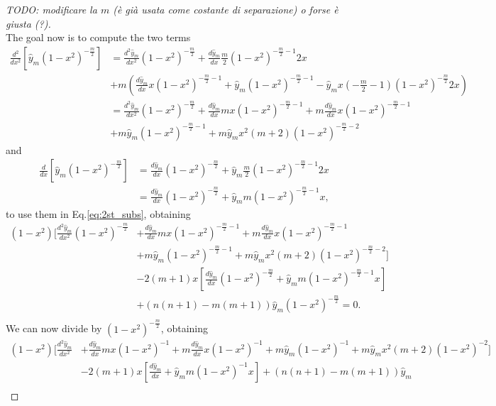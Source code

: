 \begin{proof} [TODO: modificare la $m$ (è già usata come costante di separazione) o forse è giusta (?)]
\begin{equation}
    \end{equation}
    The goal now is to compute the two terms 
    \begin{align*}
    \frac{d^2}{dx^2}[\hat{y}_m(1-x^2)^{-\frac{m}{2}}] &=  \frac{d^2\hat{y}_m}{dx^2} (1-x^2)^{-\frac{m}{2}} + \frac{d\hat{y}_m}{dx}\frac{m}{2}(1-x^2)^{-\frac{m}{2}-1}2x \\
    &+ m\left( \frac{d\hat{y}_m}{dx} x (1-x^2)^{-\frac{m}{2}-1} + \hat{y}_m (1-x^2)^{-\frac{m}{2}-1} - \hat{y}_m x (-\frac{m}{2}-1)(1-x^2)^{-\frac{m}{2}} 2x\right) \\
    &= \frac{d^2\hat{y}_m}{dx^2} (1-x^2)^{-\frac{m}{2}} + \frac{d\hat{y}_m}{dx}mx (1-x^2)^{-\frac{m}{2}-1} + m\frac{d\hat{y}_m}{dx}x (1-x^2)^{-\frac{m}{2}-1}\\
    &+ m\hat{y}_m  (1-x^2)^{-\frac{m}{2}-1} + m\hat{y}_m x^2(m+2)(1-x^2)^{-\frac{m}{2}-2}
    \end{align*}
    and
    \begin{align*}
    \frac{d}{dx}[\hat{y}_m(1-x^2)^{-\frac{m}{2}}] &= \frac{d\hat{y}_m}{dx}(1-x^2)^{-\frac{m}{2}} + \hat{y}_m\frac{m}{2}(1-x^2)^{-\frac{m}{2}-1}2x \\
    &= \frac{d\hat{y}_m}{dx}(1-x^2)^{-\frac{m}{2}} + \hat{y}_mm(1-x^2)^{-\frac{m}{2}-1}x,
    \end{align*}
    to use them in Eq.\eqref{eq:2st_subs}, obtaining
    \begin{align*}
    (1-x^2)\biggl[\frac{d^2\hat{y}_m}{dx^2} (1-x^2)^{-\frac{m}{2}} &+ \frac{d\hat{y}_m}{dx}mx (1-x^2)^{-\frac{m}{2}-1} + m\frac{d\hat{y}_m}{dx}x (1-x^2)^{-\frac{m}{2}-1} \\ 
    &+ m\hat{y}_m  (1-x^2)^{-\frac{m}{2}-1} + m\hat{y}_m x^2(m+2)(1-x^2)^{-\frac{m}{2}-2}\biggr] \\
    &-2(m+1)x\left[  \frac{d\hat{y}_m}{dx}(1-x^2)^{-\frac{m}{2}} + \hat{y}_mm(1-x^2)^{-\frac{m}{2}-1}x \right] \\
    &+ (n(n+1)-m(m+1))\hat{y}_m(1-x^2)^{-\frac{m}{2}}=0.\\
    \end{align*}
    We can now divide by $(1-x^2)^{-\frac{m}{2}}$, obtaining
    \begin{align*}
    (1-x^2)\biggl[\frac{d^2\hat{y}_m}{dx^2} &+ \frac{d\hat{y}_m}{dx}mx (1-x^2)^{-1} + m\frac{d\hat{y}_m}{dx}x (1-x^2)^{-1} + m\hat{y}_m  (1-x^2)^{-1} + m\hat{y}_m x^2(m+2)(1-x^2)^{-2}\biggr] \\
    &-2(m+1)x\left[  \frac{d\hat{y}_m}{dx} + \hat{y}_mm(1-x^2)^{-1}x \right] + (n(n+1)-m(m+1))\hat{y}_m\\

\end{align*}
\end{proof}
